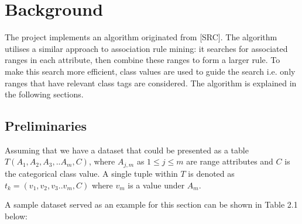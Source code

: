 \chapter{Background}

The project implements an algorithm originated from [SRC]. The algorithm utilises a similar approach to association rule mining: it searches for associated ranges in each attribute, then combine these ranges to form a larger rule. To make this search more efficient, class values are used to guide the search i.e. only ranges that have relevant class tags are considered. The algorithm is explained in the following sections.

\section{Preliminaries}

Assuming that we have a dataset that could be presented as a table $T(A_1, A_2, A_3,..A_m, C)$, where $A_{j,m}$ as $1 \leq j \leq m$ are range attributes and $C$ is the categorical class value. A single tuple within $T$ is denoted as $t_k = (v_1,v_2,v_3..v_m,C)$ where $v_m$ is a value under $A_m$.

A sample dataset served as an example for this section can be shown in Table 2.1 below: \\

 

